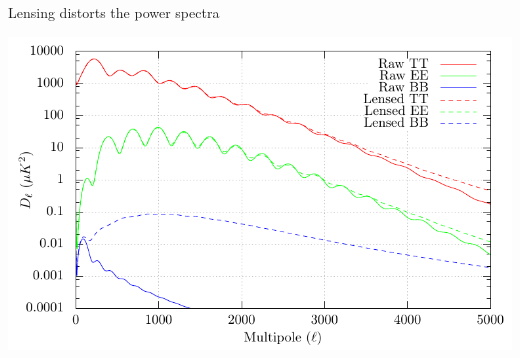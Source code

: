 \documentclass[table]{beamer}
\begin{document}
\begin{frame}{Lensing distorts the power spectra}
	\begin{center}
		\includegraphics[width=\textwidth]{plots/spectra.pdf}
	\end{center}
\end{frame}
\end{document}
